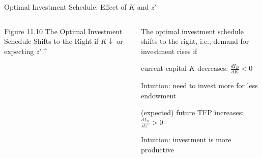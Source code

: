 \documentclass[11pt,aspectratio=169,usenames,dvipsnames]{beamer}
\let\tempone\itemize
\let\temptwo\enditemize
\renewenvironment{itemize}{\tempone\addtolength{\itemsep}{\fill}}{\temptwo}
\begin{document}
\begin{frame}{Optimal Investment Schedule: Effect of $ K $ and $ z' $}
\label{slide:Optimal_Investment_Schedule__Effect_of___K___and___z__}
     \begin{columns}
         \begin{column}{0.6\textwidth}
                \begin{center}
                    \scriptsize Figure 11.10 The Optimal Investment Schedule Shifts to the Right if $K \downarrow $ or expecting $z’ \uparrow $
                \end{center}
         \end{column}
         \begin{column}{0.4\textwidth}
            The optimal investment schedule shifts to the right, i.e., \alert{demand for investment rises} if
            \begin{itemize}
                \item current capital $ K $ decreases:
                    $ \displaystyle \frac{d I_{D}}{d K} < 0 $
                \begin{itemize}
                    \item Intuition: need to invest more for less endowment
                \end{itemize}
                \item (expected) future TFP increases:
                    $ \displaystyle \frac{d I_{D}}{d z'} > 0 $
                \begin{itemize}
                    \item Intuition: investment is more productive
                \end{itemize}
            \end{itemize}
         \end{column}
     \end{columns}
\end{frame}
\end{document}
